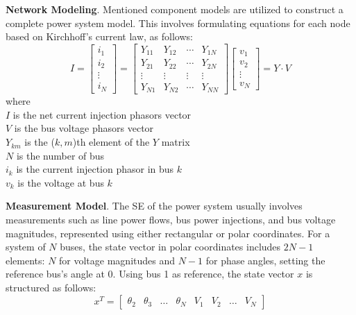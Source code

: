 \textbf{Network Modeling}. Mentioned component models are utilized to construct a complete power system model. This involves formulating equations for each node based on Kirchhoff's current law, as follows:
\begin{equation}
    I=\left[\begin{array}{c}
i_{1} \\
i_{2} \\
\vdots \\
i_{N}
\end{array}\right]=\left[\begin{array}{cccc}
Y_{11} & Y_{12} & \cdots & Y_{1 N} \\
Y_{21} & Y_{22} & \cdots & Y_{2 N} \\
\vdots & \vdots & \vdots & \vdots \\
Y_{N 1} & Y_{N 2} & \cdots & Y_{N N}
\end{array}\right]\left[\begin{array}{c}
v_{1} \\
v_{2} \\
\vdots \\
v_{N}
\end{array}\right]=Y \cdot V
\end{equation}
where \\ 
$I$ is the net current injection phasors vector\\
$V$ is the bus voltage phasors vector\\  
$Y_{km}$ is the ($k,m$)th element of the $Y$ matrix\\ 
$N$ is the number of bus\\
$i_k$ is the current injection phasor in bus $k$\\
$v_k$ is the voltage at bus $k$

\textbf{Measurement Model}. The SE of the power system usually involves measurements such as line power flows, bus power injections, and bus voltage magnitudes, represented using either rectangular or polar coordinates. For a system of $N$ buses, the state vector in polar coordinates includes \(2N-1\) elements: $N$ for voltage magnitudes and \(N-1\) for phase angles, setting the reference bus's angle at 0. Using bus 1 as reference, the state vector $x$ is structured as follows:
\begin{equation}
    x^{T}=\left[\begin{array}{llllllll}
\theta_{2} & \theta_{3} & \ldots & \theta_{N} & V_{1} & V_{2} & \ldots & V_{N}
\end{array}\right]
\end{equation}


